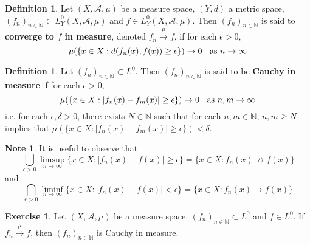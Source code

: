 \documentclass{book}
\theoremstyle{definition}
\newtheorem{defn}[definition]{Definition}
\newtheorem{note}[definition]{Note}
\newtheorem{ex}[definition]{Exercise}
\newcommand{\del}{\delta}
\newcommand{\ep}{\epsilon}
\newcommand{\N}{\mathbb{N}}
\newcommand{\MA}{\mathcal{A}}
\newcommand{\lex}[1]{\label{ex:#1}}
\newcommand{\ld}[1]{\label{defn:#1}}
\DeclareMathOperator*{\0}{\mbf{0}}
\DeclareMathOperator*{\1}{\mbf{1}}
\newcommand{\conv}[1]{\xrightarrow{#1}}
\begin{document}
	\begin{defn} \ld{35001} 
		Let $(X, \MA, \mu)$ be a measure space, $(Y,d)$ a metric space, $(f_n)_{n \in \N} \subset L_Y^0(X, \MA, \mu)$ and $f \in L_Y^0(X, \MA, \mu)$. Then $(f_n)_{n \in \N}$ is said to \textbf{converge to $f$ in measure}, denoted $f_n \xrightarrow{\mu} f$, if for each $\ep > 0$, $$\mu(\{x \in X: d(f_n(x), f(x)) \geq \ep \}) \rightarrow 0 \hspace{.2cm }\text{ as } n \rightarrow \infty$$
	\end{defn}
	
	\begin{defn} \ld{35002} 
	Let $(f_n)_{n \in \N} \subset L^0$. Then $(f_n)_{n \in \N}$ is said to be \textbf{Cauchy in measure} if for each $\ep >0$, $$\mu(\{x \in X: |f_n(x) - f_m(x)| \geq \ep \}) \rightarrow 0 \hspace{.2cm }\text{ as } n,m \rightarrow \infty$$ 
	i.e. for each $\ep, \del >0$, there exists $N \in \N$ such that for each $n,m \in \N$, $n,m \geq N$ implies that $\mu(\{x \in X: |f_n(x) - f_m(x)| \geq \ep \}) < \del$.
	\end{defn}
	
	\begin{note}
		It is useful to observe that 
		$$\bigcup_{\ep >0}\limsup\limits_{n \rightarrow \infty} \{x \in X: |f_n(x) - f(x)| \geq \ep \} = \{x \in X: f_n(x) \not \rightarrow f(x) \}$$ 
		and 
		$$\bigcap_{\ep > 0} \liminf_{n \rightarrow \infty}\{x \in X: |f_n(x) - f(x)| < \ep \} = \{x \in X: f_n(x) \rightarrow f(x) \}$$ 
	\end{note}
	
	\begin{ex} \lex{35002.1} 
	Let $(X, \MA, \mu)$ be a measure space, $(f_n)_{n \in \N} \subset L^0$ and $f \in L^0$. If $f_n \conv{\mu} f$, then $(f_n)_{n \in \N}$ is Cauchy in measure.
	\end{ex}
	
\end{document}
